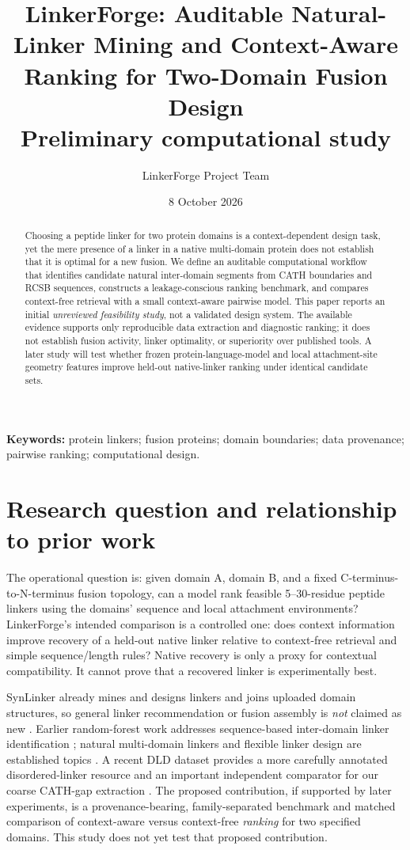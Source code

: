 \documentclass[10pt,a4paper]{article}
\title{LinkerForge: Auditable Natural-Linker Mining and Context-Aware Ranking for Two-Domain Fusion Design\\\large Preliminary computational study}
\author{LinkerForge Project Team}
\date{8 October 2026}
\begin{document}
\maketitle
\begin{abstract}
Choosing a peptide linker for two protein domains is a context-dependent design task, yet the mere presence of a linker in a native multi-domain protein does not establish that it is optimal for a new fusion. We define an auditable computational workflow that identifies candidate natural inter-domain segments from CATH boundaries and RCSB sequences, constructs a leakage-conscious ranking benchmark, and compares context-free retrieval with a small context-aware pairwise model. This paper reports an initial \emph{unreviewed feasibility study}, not a validated design system. The available evidence supports only reproducible data extraction and diagnostic ranking; it does not establish fusion activity, linker optimality, or superiority over published tools. A later study will test whether frozen protein-language-model and local attachment-site geometry features improve held-out native-linker ranking under identical candidate sets.
\end{abstract}

\noindent\textbf{Keywords:} protein linkers; fusion proteins; domain boundaries; data provenance; pairwise ranking; computational design.

\section{Research question and relationship to prior work}
The operational question is: given domain A, domain B, and a fixed C-terminus-to-N-terminus fusion topology, can a model rank feasible 5--30-residue peptide linkers using the domains' sequence and local attachment environments? LinkerForge's intended comparison is a controlled one: does context information improve recovery of a held-out native linker relative to context-free retrieval and simple sequence/length rules? Native recovery is only a proxy for contextual compatibility. It cannot prove that a recovered linker is experimentally best.

SynLinker already mines and designs linkers and joins uploaded domain structures, so general linker recommendation or fusion assembly is \emph{not} claimed as new \cite{synlinker}. Earlier random-forest work addresses sequence-based inter-domain linker identification \cite{drop}; natural multi-domain linkers and flexible linker design are established topics \cite{chen}. A recent DLD dataset provides a more carefully annotated disordered-linker resource and an important independent comparator for our coarse CATH-gap extraction \cite{dld}. The proposed contribution, if supported by later experiments, is a provenance-bearing, family-separated benchmark and matched comparison of context-aware versus context-free \emph{ranking} for two specified domains. This study does not yet test that proposed contribution.
\end{document}

